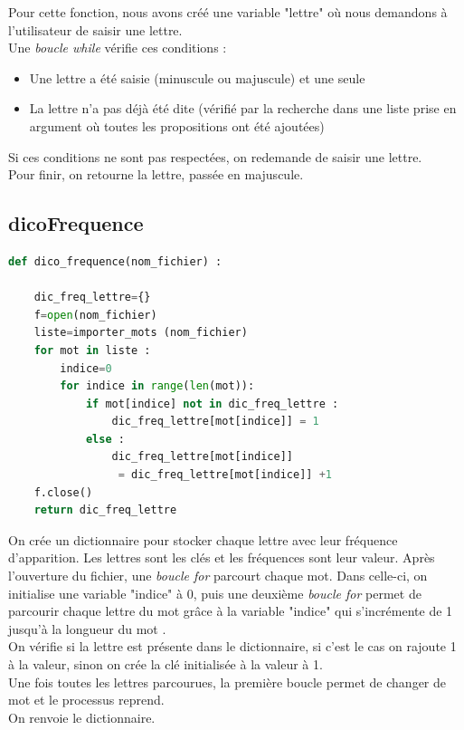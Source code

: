 \documentclass[french,10pt,a4paper]{article}	%
\begin{document}
	Pour cette fonction, nous avons créé une variable "lettre" où nous demandons à l'utilisateur de saisir une lettre.\\ 
	Une \textit{boucle while} vérifie ces conditions :\\
	
	\begin{itemize}
	\item Une lettre a été saisie (minuscule ou majuscule) et une seule
	\item La lettre n'a pas déjà été dite (vérifié par la recherche dans une liste prise en argument où toutes les propositions ont été ajoutées)
	\end{itemize}
	
	Si ces conditions ne sont pas respectées, on redemande de saisir une lettre. \\
	Pour finir, on retourne la lettre, passée en majuscule.

	
	\subsection{dicoFrequence}
	
	
		\begin{lstlisting}[language=Python, frame=single]
def dico_frequence(nom_fichier) :

	dic_freq_lettre={}	
	f=open(nom_fichier)
	liste=importer_mots (nom_fichier)
	for mot in liste : 								
		indice=0
		for indice in range(len(mot)): 
			if mot[indice] not in dic_freq_lettre : 
				dic_freq_lettre[mot[indice]] = 1 		
			else :
				dic_freq_lettre[mot[indice]]
				 = dic_freq_lettre[mot[indice]] +1 	
	f.close()
	return dic_freq_lettre													
	\end{lstlisting}
	
	On crée un dictionnaire pour stocker chaque lettre avec leur fréquence d'apparition. Les lettres sont les clés et les fréquences sont leur valeur. Après l'ouverture du fichier, une \textit{boucle for} parcourt chaque mot. Dans celle-ci, on initialise une variable "indice" à 0, puis une deuxième \textit{boucle for} permet de parcourir chaque lettre du mot grâce à la variable "indice" qui s'incrémente de 1 jusqu'à la longueur du mot . \\
	On vérifie si la lettre est présente dans le dictionnaire, si c'est le cas on rajoute 1 à la valeur, sinon on crée la clé initialisée à la valeur à 1. \\
	Une fois toutes les lettres parcourues, la première boucle permet de changer de mot et le processus reprend. \\
	On renvoie le dictionnaire.
	
\end{document}
